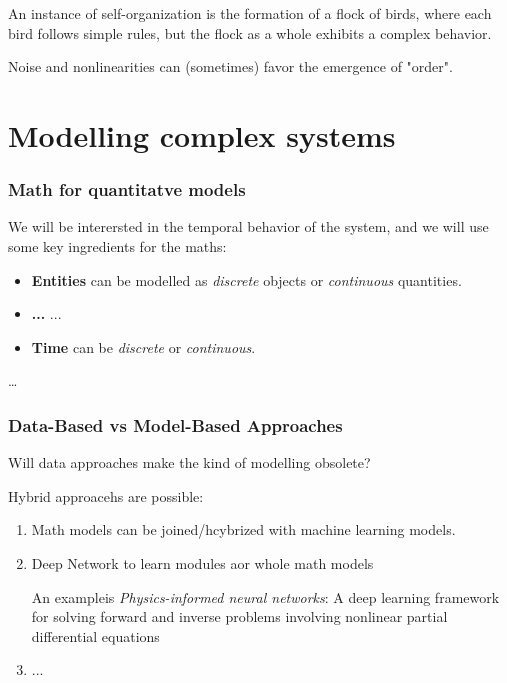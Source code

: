 An instance of self-organization is the formation of a flock of birds, where each bird follows simple rules, but the flock as a whole exhibits a complex behavior.

\begin{observationblock}
Noise and nonlinearities can (sometimes) favor the emergence of "order".
\end{observationblock}

\section{Modelling complex systems}

\subsubsection{Math for quantitatve models}

We will be interersted in the temporal behavior of the system, and we will use some key ingredients for the maths:

\begin{itemize}
    \item \textbf{Entities} can be modelled as \textit{discrete} objects or \textit{continuous} quantities.
    \item \textbf{...} ...
    \item \textbf{Time} can be \textit{discrete} or \textit{continuous}.
\end{itemize}

\dots

\subsubsection{Data-Based vs Model-Based Approaches}

Will data approaches make the kind of modelling obsolete?



Hybrid approacehs are possible: 

\begin{enumerate}
    \item Math models can be joined/hcybrized with machine learning models.
    \item Deep Network to learn modules aor whole math models

        An exampleis \textit{Physics-informed neural networks}: A deep learning framework for solving forward and inverse problems involving nonlinear partial differential equations

    \item ...
\end{enumerate}

